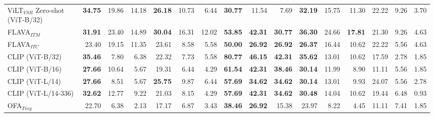 \begin{table}[ht]
\begin{adjustbox}{max width=\textwidth}
\begin{tabular}{l|rrr|rrr|rrr|rrr|rrr}
 ViLT$_{VSR}$ Zero-shot (ViT-B/32)   & \textbf{34.75} & 19.86          & 14.18          & \textbf{26.18} & 10.73          & 6.44           & \textbf{30.77} & 11.54          & 7.69           & \textbf{32.19} & 15.75          & 11.30          & 22.22          & 9.26           & 3.70           \\
 FLAVA$_{ITM}$                       & \textbf{31.91} & 23.40          & 14.89          & \textbf{30.04} & 16.31          & 12.02          & \textbf{53.85} & \textbf{42.31} & \textbf{30.77} & \textbf{36.30} & 24.66          & \textbf{17.81} & 21.30          & 9.26           & 4.63           \\
 FLAVA$_{ITC}$                       & 23.40          & 19.15          & 11.35          & 23.61          & 8.58           & 5.58           & \textbf{50.00} & \textbf{26.92} & \textbf{26.92} & \textbf{26.37} & 16.44          & 10.62          & 22.22          & 5.56           & 4.63           \\
 CLIP (ViT-B/32)                     & \textbf{35.46} & 7.80           & 6.38           & 22.32          & 7.73           & 5.58           & \textbf{80.77} & \textbf{46.15} & \textbf{42.31} & \textbf{35.62} & 13.01          & 10.62          & 17.59          & 2.78           & 1.85           \\
 CLIP (ViT-B/16)                     & \textbf{27.66} & 10.64          & 5.67           & 19.31          & 6.44           & 4.29           & \textbf{61.54} & \textbf{42.31} & \textbf{38.46} & \textbf{30.14} & 11.99          & 8.90           & 11.11          & 5.56           & 1.85           \\
 CLIP (ViT-L/14)                     & \textbf{27.66} & 8.51           & 5.67           & \textbf{25.75} & 9.87           & 6.44           & \textbf{57.69} & \textbf{34.62} & \textbf{34.62} & \textbf{30.14} & 13.01          & 9.93           & 24.07          & 5.56           & 2.78           \\
 CLIP (ViT-L/14-336)                 & \textbf{32.62} & 12.77          & 9.22           & 21.03          & 8.15           & 4.29           & \textbf{57.69} & \textbf{42.31} & \textbf{34.62} & \textbf{30.48} & 14.04          & 10.62          & 19.44          & 6.48           & 0.93           \\
 OFA$_{Tiny}$                        & 22.70          & 6.38           & 2.13           & 17.17          & 6.87           & 3.43           & \textbf{38.46} & \textbf{26.92} & 15.38          & 23.97          & 8.22           & 4.45           & 11.11          & 7.41           & 1.85           \\

\end{tabular}
\end{adjustbox}
\end{table}
